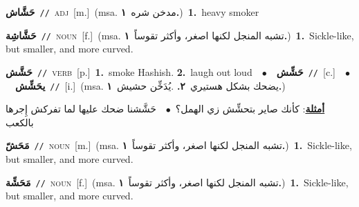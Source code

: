 \documentclass[10pt,a4paper,twoside]{article} %
\begin{document}
\begin{multicols}{2}
{\setlength\topsep{0pt}\textbf{\foreignlanguage{arabic}{حَشَّاش}}\ {\color{gray}\texttt{//}\color{black}}\ \textsc{adj}\ [m.]\ \color{gray}(msa. \foreignlanguage{arabic}{مدخن شره}~\foreignlanguage{arabic}{\textbf{١.}})\color{black}\ \textbf{1.}~heavy smoker\ } \vspace{2mm}

{\setlength\topsep{0pt}\textbf{\foreignlanguage{arabic}{حَشَّاشِة}}\ {\color{gray}\texttt{//}\color{black}}\ \textsc{noun}\ [f.]\ \color{gray}(msa. \foreignlanguage{arabic}{تشبه المنجل لكنها اصغر، وأكثر تقوساً}~\foreignlanguage{arabic}{\textbf{١.}})\color{black}\ \textbf{1.}~Sickle-like, but smaller, and more curved.\ } \vspace{2mm}

{\setlength\topsep{0pt}\textbf{\foreignlanguage{arabic}{حَشَّش}}\ {\color{gray}\texttt{//}\color{black}}\ \textsc{verb}\ [p.]\ \textbf{1.}~smoke Hashish.  \textbf{2.}~laugh out loud\ \ $\bullet$\ \ \setlength\topsep{0pt}\textbf{\foreignlanguage{arabic}{حَشِّش}}\ {\color{gray}\texttt{//}\color{black}}\ [c.]\ \ $\bullet$\ \ \setlength\topsep{0pt}\textbf{\foreignlanguage{arabic}{يحَشِّش}}\ {\color{gray}\texttt{//}\color{black}}\ [i.]\ \color{gray}(msa. \foreignlanguage{arabic}{يضحك بشكل هستيري}~\foreignlanguage{arabic}{\textbf{٢.}}  .\foreignlanguage{arabic}{يُدَخِّن حشيش}~\foreignlanguage{arabic}{\textbf{١.}})\color{black}\  \begin{flushright}\color{gray}\foreignlanguage{arabic}{\textbf{\underline{\foreignlanguage{arabic}{أمثلة}}}: كأنك صاير بتحشِّش زي الهمل؟\ $\bullet$\ \  حَشَّشنا ضحك عليها لما تفركش إِجرها بالكعب}\end{flushright}\color{black}} \vspace{2mm}

{\setlength\topsep{0pt}\textbf{\foreignlanguage{arabic}{مَحَشّ}}\ {\color{gray}\texttt{//}\color{black}}\ \textsc{noun}\ [m.]\ \color{gray}(msa. \foreignlanguage{arabic}{تشبه المنجل لكنها اصغر، وأكثر تقوساً}~\foreignlanguage{arabic}{\textbf{١.}})\color{black}\ \textbf{1.}~Sickle-like, but smaller, and more curved.\ } \vspace{2mm}

{\setlength\topsep{0pt}\textbf{\foreignlanguage{arabic}{مَحَشِّة}}\ {\color{gray}\texttt{//}\color{black}}\ \textsc{noun}\ [f.]\ \color{gray}(msa. \foreignlanguage{arabic}{تشبه المنجل لكنها اصغر، وأكثر تقوساً}~\foreignlanguage{arabic}{\textbf{١.}})\color{black}\ \textbf{1.}~Sickle-like, but smaller, and more curved.\ } \vspace{2mm}


\end{multicols}
\end{document}
